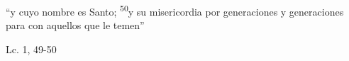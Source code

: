 \documentclass[../../rosario.tex]{subfiles}
\begin{document}
    ``y cuyo nombre es Santo; \textsuperscript{50}y su misericordia por generaciones y generaciones para con aquellos que le temen''
    \begin{flushright}
    Lc. 1, 49-50          
    \end{flushright}
\end{document}
